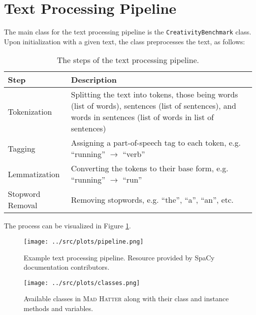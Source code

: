 \section{Text Processing Pipeline}
The main class for the text processing pipeline is the \texttt{CreativityBenchmark} class. Upon initialization with a given text, the class preprocesses the text, as follows:

\begin{table}[htbp]
    \begin{tabular}{p{}p{}}
        \toprule
        \textbf{Step} & \textbf{Description} \\
        \midrule
        Tokenization & Splitting the text into tokens, those being words (list of words), sentences (list of sentences), and words in sentences (list of words in list of sentences) \\
        Tagging & Assigning a part-of-speech tag to each token, e.g. ``running'' $\to$ ``verb'' \\
        Lemmatization & Converting the tokens to their base form, e.g. ``running'' $\to$ ``run'' \\
        Stopword Removal & Removing stopwords, e.g. ``the'', ``a'', ``an'', etc. \\
        \bottomrule
        
    \end{tabular}
    \caption{The steps of the text processing pipeline.}
\end{table}

The process can be visualized in Figure \ref{fig:processing_pipeline}. 

\begin{figure}[htbp]
    \centering
    \texttt{[image: ../src/plots/pipeline.png]}
    \caption{Example text processing pipeline. Resource provided by SpaCy documentation contributors.}\label{fig:processing_pipeline}
\end{figure}


\begin{figure}[htbp]
    \centering
    \texttt{[image: ../src/plots/classes.png]}
    \caption{Available classes in \textsc{Mad Hatter} along with their class and instance methods and variables. }
\end{figure}

